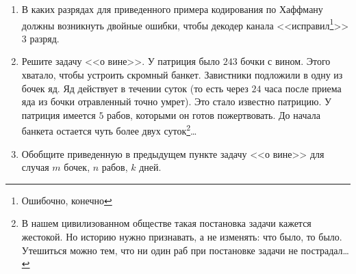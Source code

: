 \begin{enumerate}
    \item В каких разрядах для приведенного примера кодирования по Хаффману должны возникнуть двойные ошибки, чтобы декодер канала <<исправил\footnote{Ошибочно, конечно}>> $3$ разряд.
    
    \item Решите задачу <<о вине>>. У патриция было $243$ бочки с вином. Этого хватало, чтобы устроить скромный банкет. Завистники подложили в одну из бочек яд. Яд действует в течении суток (то есть через $24$ часа после приема яда из бочки отравленный точно умрет). Это стало известно патрицию. У патриция имеется $5$ рабов, которыми он готов пожертвовать. До начала банкета остается чуть более двух суток\footnote{В нашем цивилизованном обществе такая постановка задачи кажется жестокой. Но историю нужно признавать, а не изменять: что было, то было. Утешиться можно тем, что ни один раб при постановке задачи не пострадал\ldots}\ldots
    
    \item Обобщите приведенную в предыдущем пункте задачу <<о вине>> для случая $m$ бочек, $n$ рабов, $k$ дней.
    
\end{enumerate}
